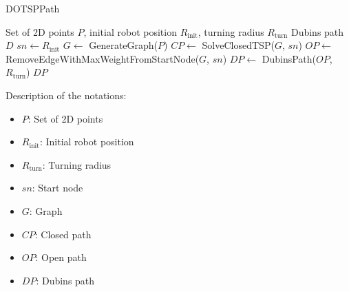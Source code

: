 \begin{algorithm}[H]
    \caption{DOTSPPath}
    \label{alg:dotsp_path}
    \begin{algorithmic}[1]
    \Require Set of 2D points $P$, initial robot position $R_{\text{init}}$, turning radius $R_{\text{turn}}$
    \Ensure Dubins path $D$
    \State $sn \leftarrow R_{\text{init}}$
    \State $G \leftarrow$ GenerateGraph($P$)
    \State $CP \leftarrow$ SolveClosedTSP($G$, $sn$)
    \State $OP \leftarrow$ RemoveEdgeWithMaxWeightFromStartNode($G$, $sn$)
    \State $DP \leftarrow$ DubinsPath($OP$, $R_{\text{turn}}$)
    \State \Return $DP$
    \end{algorithmic}
    \end{algorithm}
    
    Description of the notations:
    \begin{itemize}[noitemsep,topsep=0pt]
        \item $P$: Set of 2D points
        \item $R_{\text{init}}$: Initial robot position
        \item $R_{\text{turn}}$: Turning radius
        \item $sn$: Start node
        \item $G$: Graph
        \item $CP$: Closed path
        \item $OP$: Open path
        \item $DP$: Dubins path
    \end{itemize}
    






































